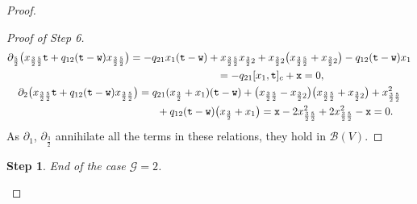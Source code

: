 \documentclass[pdftex]{sigma}
\numberwithin{equation}{section}
\newtheorem{stepiv}{Step}
\newcommand{\toba}{\mathscr B}
\newcommand{\ghost}{\mathscr{G}}
\newcommand{\ttt}{\mathtt{t}}
\newcommand{\wt}{\mathtt{w}}
\newcommand{\xt}{\mathtt{x}}
\newcommand{\tresdos}{\frac{3}{2}}
\newcommand{\cincodos}{\frac{5}{2}}
\begin{document}
\begin{proof}
\begin{proof}[Proof of Step 6]
\begin{gather*}
\partial_{\cincodos} \big(x_{\tresdos\cincodos} \ttt +q_{12}(\ttt-\wt)x_{\tresdos\cincodos}\big)=
-q_{21}x_1 (\ttt-\wt) + x_{\tresdos\cincodos}x_{\tresdos2}+x_{\tresdos2}\big(x_{\tresdos\cincodos}+x_{\tresdos2}\big)-q_{12}(\ttt-\wt)x_1
\\ \hphantom{\partial_{\cincodos} \big(x_{\tresdos\cincodos} \ttt +q_{12}(\ttt-\wt)x_{\tresdos\cincodos}\big)}
{} = -q_{21}[x_1,\ttt]_c+\xt = 0,
\\
\partial_{2} \big(x_{\tresdos\cincodos} \ttt +q_{12}(\ttt-\wt)x_{\tresdos\cincodos}\big) =
q_{21}(x_{\tresdos}+x_1) (\ttt-\wt) +\big(x_{\tresdos\cincodos}-x_{\tresdos2}\big)\big(x_{\tresdos\cincodos}+x_{\tresdos2}\big)+ x_{\tresdos\cincodos}^2
\\ \hphantom{\partial_{2} \big(x_{\tresdos\cincodos} \ttt +q_{12}(\ttt-\wt)x_{\tresdos\cincodos}\big) =}
 +q_{12}(\ttt-\wt)\big(x_{\tresdos}+x_1\big)
= \xt-2x_{\tresdos\cincodos}^2+ 2x_{\tresdos\cincodos}^2-\xt=0.
\end{gather*}
As $\partial_1$, $\partial_{\tresdos}$ annihilate all the terms in these relations, they hold in $\toba(V)$.
\end{proof}

\begin{stepiv}
End of the case $\ghost = 2$.
\end{stepiv}


\end{proof}
\end{document}
